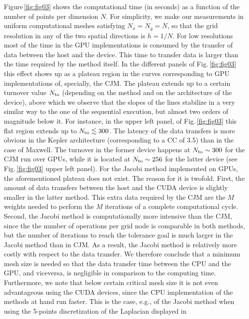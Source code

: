 \documentclass[preprint,12pt]{elsarticle}
\begin{document}
Figure\,\mbox{\ref{fig:fig03}} shows the computational time (in
seconds) as a function of the number of points per dimension $N$. For
simplicity, we make our measurements in uniform computational meshes
satisfying $N_x=N_y=N$, so that the grid resolution in any of the two
spatial directions is $h=1/N$.  For low resolutions most of the time
in the GPU implementations is consumed by the transfer of data between
the host and the device. This time to transfer data is larger than the
time required by the method itself. In the different panels of
Fig.\,\mbox{\ref{fig:fig03}} this effect shows up as a plateau region
in the curves corresponding to GPU implementations of, specially, the
CJM. The plateau extends up to a certain turnover value $N_{\rm to}$
(depending on the method and on the architecture of the device), above
which we observe that the slopes of the lines stabilize in a very
similar way to the one of the sequential execution, but almost two
orders of magnitude below it. For instance, in the upper left panel,
of Fig.\,\ref{fig:fig03} this flat region extends up to
$N_{\rm to}\lesssim 300$. The latency of the data transfers is more
obvious in the Kepler architecture (corresponding to a CC of 3.5) than
in the case of Maxwell. The turnover in the former device happens at
$N_{\rm to}\sim 300$ for the CJM run over GPUs, while it is located at
$N_{\rm to}\sim 256$ for the latter device (see Fig.\,\ref{fig:fig03}
upper left panel). For the Jacobi method implemented on GPUs, the
aforementioned plateau does not exist. The reason for it is
  twofold. First, the amount of data transfers between the host and
  the CUDA device is slightly smaller in the latter method. This extra
  data required by the CJM are the $M$ weights needed to perform the $M$
  iterations of a complete computational cycle. Second, the Jacobi
  method is computationally more intensive than the CJM, since the the
  number of operations per grid node is comparable in both methods,
  but the number of iterations to reach the tolerance goal is much
  larger in the Jacobi method than in CJM. As a result, the Jacobi
  method is relatively more costly with respect to the data transfer.
We therefore conclude that a minimum mesh size is needed so that the
data transfer time between the CPU and the GPU, and viceversa, is
negligible in comparison to the computing time. Furthermore, we note
that below certain critical mesh size it is not even advantageous
using the CUDA devices, since the CPU implementation of the methods at
hand run faster. This is the case, e.g., of the Jacobi method when
using the 5-points discretization of the Laplacian displayed in
\end{document}

